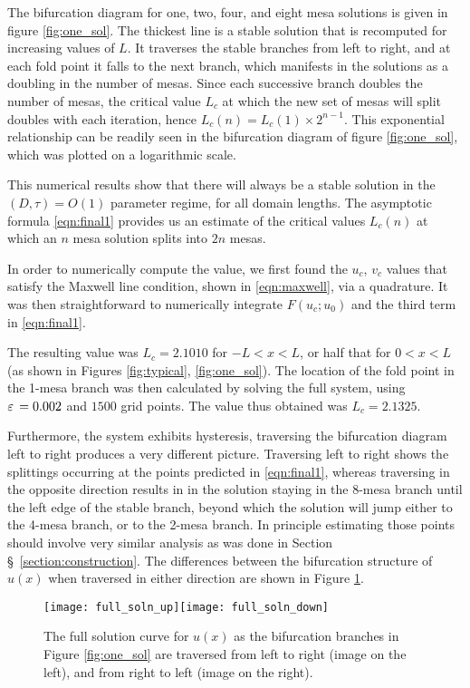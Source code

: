 The bifurcation diagram for one, two, four, and eight mesa solutions is given in figure \ref{fig:one_sol}. The thickest line is a stable solution that is recomputed for increasing values of $L$. It traverses the stable branches from left to right, and at each fold point it falls to the next branch, which manifests in the solutions as a doubling in the number of mesas. Since each successive branch doubles the number of mesas, the critical value $L_c$ at which the new set of mesas will split doubles with each iteration, hence $L_c(n)=L_c(1)\times 2^{n-1}$. This exponential relationship can be readily seen in the bifurcation diagram of figure \ref{fig:one_sol}, which was plotted on a logarithmic scale.

This numerical results show that there will always be a stable solution in the $(D,\tau)=O(1)$ parameter regime, for all domain lengths. The asymptotic formula \eqref{eqn:final1} provides us an estimate of the critical values $L_c(n)$ at which an $n$ mesa solution splits into $2n$ mesas. 

In order to numerically compute the value, we first found the $u_c$, $v_c$ values that satisfy the Maxwell line condition, shown in \eqref{eqn:maxwell}, via a quadrature. It was then straightforward to numerically integrate $F(u_c;u_0)$ and the third term in \eqref{eqn:final1}. 

The resulting value was $L_c = 2.1010$ for $-L<x<L$, or half that for $0<x<L$ (as shown in Figures \ref{fig:typical}, \ref{fig:one_sol}). The location of the fold point in the 1-mesa branch was then calculated by solving the full system, using $\varepsilon\,=0.002$ and $1500$ grid points. The value thus obtained was $L_c = 2.1325$.

Furthermore, the system exhibits hysteresis, traversing the bifurcation diagram left to right produces a very different picture. Traversing left to right shows the splittings occurring at the points predicted in \eqref{eqn:final1}, whereas traversing in the opposite direction results in in the solution staying in the 8-mesa branch until the left edge of the stable branch, beyond which the solution will jump either to the 4-mesa branch, or to the 2-mesa branch. In principle estimating those points should involve very similar analysis as was done in Section \S~\ref{section:construction}. The differences between the bifurcation structure of $u(x)$ when traversed in either direction are shown in Figure \ref{fig:up_down}.
% 
\begin{figure}[htb]
\begin{center}
\texttt{[image: full\_soln\_up]}\texttt{[image: full\_soln\_down]}
\caption{The full solution curve for $u(x)$ as the bifurcation branches in Figure \ref{fig:one_sol} are traversed from left to right (image on the left), and from right to left (image on the right).}
\label{fig:up_down}
\end{center}
\end{figure}
% 

